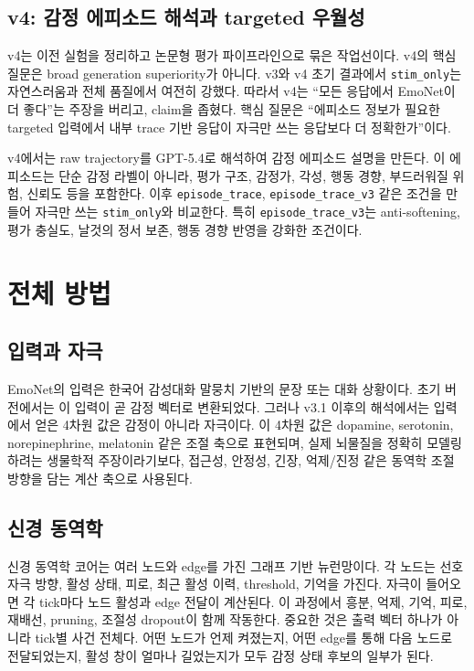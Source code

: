 \documentclass[11pt,a4paper]{article}
\newcommand{\eng}[1]{\texttt{#1}}
\begin{document}
\subsection{v4: 감정 에피소드 해석과 targeted 우월성}

v4는 이전 실험을 정리하고 논문형 평가 파이프라인으로 묶은 작업선이다. v4의 핵심 질문은 broad generation superiority가 아니다. v3와 v4 초기 결과에서 \eng{stim\_only}는 자연스러움과 전체 품질에서 여전히 강했다. 따라서 v4는 ``모든 응답에서 EmoNet이 더 좋다''는 주장을 버리고, claim을 좁혔다. 핵심 질문은 ``에피소드 정보가 필요한 targeted 입력에서 내부 trace 기반 응답이 자극만 쓰는 응답보다 더 정확한가''이다.

v4에서는 raw trajectory를 GPT-5.4로 해석하여 감정 에피소드 설명을 만든다. 이 에피소드는 단순 감정 라벨이 아니라, 평가 구조, 감정가, 각성, 행동 경향, 부드러워질 위험, 신뢰도 등을 포함한다. 이후 \eng{episode\_trace}, \eng{episode\_trace\_v3} 같은 조건을 만들어 자극만 쓰는 \eng{stim\_only}와 비교한다. 특히 \eng{episode\_trace\_v3}는 anti-softening, 평가 충실도, 날것의 정서 보존, 행동 경향 반영을 강화한 조건이다.

\section{전체 방법}

\subsection{입력과 자극}

EmoNet의 입력은 한국어 감성대화 말뭉치 기반의 문장 또는 대화 상황이다. 초기 버전에서는 이 입력이 곧 감정 벡터로 변환되었다. 그러나 v3.1 이후의 해석에서는 입력에서 얻은 4차원 값은 감정이 아니라 자극이다. 이 4차원 값은 dopamine, serotonin, norepinephrine, melatonin 같은 조절 축으로 표현되며, 실제 뇌물질을 정확히 모델링하려는 생물학적 주장이라기보다, 접근성, 안정성, 긴장, 억제/진정 같은 동역학 조절 방향을 담는 계산 축으로 사용된다.

\subsection{신경 동역학}

신경 동역학 코어는 여러 노드와 edge를 가진 그래프 기반 뉴런망이다. 각 노드는 선호 자극 방향, 활성 상태, 피로, 최근 활성 이력, threshold, 기억을 가진다. 자극이 들어오면 각 tick마다 노드 활성과 edge 전달이 계산된다. 이 과정에서 흥분, 억제, 기억, 피로, 재배선, pruning, 조절성 dropout이 함께 작동한다. 중요한 것은 출력 벡터 하나가 아니라 tick별 사건 전체다. 어떤 노드가 언제 켜졌는지, 어떤 edge를 통해 다음 노드로 전달되었는지, 활성 창이 얼마나 길었는지가 모두 감정 상태 후보의 일부가 된다.
\end{document}
